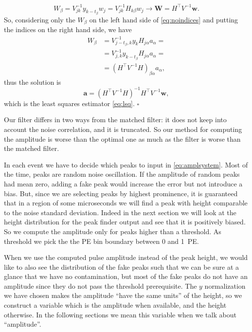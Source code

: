 
\begin{equation}
    W_\beta = V^{-1}_{jk} y_{k-t_\beta} w_j = V^{-1}_{jk} H_{k\beta} w_j
    \rightarrow \mathbf W = H^\top V^{-1} \mathbf w.
\end{equation}
%
So, considering only the $W_\beta$ on the left hand side of
\eqref{eq:noindices} and putting the indices on the right hand side, we have
%
\begin{align}
    W_\beta &= V^{-1}_{j-t_\beta,k} y_k H_{j\alpha} a_\alpha = \\
    &= V^{-1}_{j,k} y_{k-t_\beta} H_{j\alpha} a_\alpha = \\
    &= (H^\top V^{-1} H)_{\beta\alpha} a_\alpha,
\end{align}
%
thus the solution is
%
\begin{equation}
    \mathbf a = (H^\top V^{-1} H)^{-1} H^\top V^{-1} \mathbf w,
\end{equation}
%
which is the least squares estimator \eqref{eq:lsq}. \hfill $\square$

Our filter differs in two ways from the matched filter: it does not keep into
account the noise correlation, and it is truncated. So our method for computing
the amplitude is worse than the optimal one as much as the filter is worse than
the matched filter.

In each event we have to decide which peaks to input in \eqref{eq:amplsystem}.
Most of the time, peaks are random noise oscillation. If the amplitude of
random peaks had mean zero, adding a fake peak would increase the error but not
introduce a bias. But, since we are selecting peaks by highest prominence, it
is guaranteed that in a region of some microseconds we will find a peak with
height comparable to the noise standard deviation. Indeed in the next section
we will look at the height distribution for the peak finder output and see that
it is positively biased. So we compute the amplitude only for peaks higher than
a threshold. As threshold we pick the the PE bin boundary between 0 and 1~PE.

When we use the computed pulse amplitude instead of the peak height, we would
like to also see the distribution of the fake peaks such that we can be sure at
a glance that we have no contamination, but most of the fake peaks do not have
an amplitude since they do not pass the threshold prerequisite. The $y$
normalization we have chosen makes the amplitude ``have the same units'' of the
height, so we construct a variable which is the amplitude when available, and
the height otherwise. In the following sections we mean this variable when we
talk about ``amplitude''.

